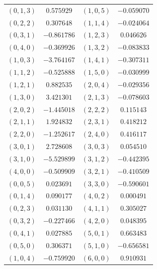 \begin{table}
\begin{tabular}{cc@{\qquad}cc}
$(0,1,3)$ & $0.575929$ & $(1,0,5)$ & $-0.059070$ \\
$(0,2,2)$ & $0.307648$ & $(1,1,4)$ & $-0.024064$ \\
$(0,3,1)$ & $-0.861786$ & $(1,2,3)$ & $0.046626$ \\
$(0,4,0)$ & $-0.369926$ & $(1,3,2)$ & $-0.083833$ \\
$(1,0,3)$ & $-3.764167$ & $(1,4,1)$ & $-0.307311$ \\
$(1,1,2)$ & $-0.525888$ & $(1,5,0)$ & $-0.030999$ \\
$(1,2,1)$ & $0.882535$ & $(2,0,4)$ & $-0.029356$ \\
$(1,3,0)$ & $3.421301$ & $(2,1,3)$ & $-0.078603$ \\
$(2,0,2)$ & $-1.445018$ & $(2,2,2)$ & $0.115143$ \\
$(2,1,1)$ & $1.924832$ & $(2,3,1)$ & $0.418212$ \\
$(2,2,0)$ & $-1.252617$ & $(2,4,0)$ & $0.416117$ \\
$(3,0,1)$ & $2.728608$ & $(3,0,3)$ & $0.054510$ \\
$(3,1,0)$ & $-5.529899$ & $(3,1,2)$ & $-0.442395$ \\
$(4,0,0)$ & $-0.509909$ & $(3,2,1)$ & $-0.410509$ \\
$(0,0,5)$ & $0.023691$ & $(3,3,0)$ & $-0.590601$ \\
$(0,1,4)$ & $0.090177$ & $(4,0,2)$ & $0.000491$ \\
$(0,2,3)$ & $0.031130$ & $(4,1,1)$ & $0.305027$ \\
$(0,3,2)$ & $-0.227466$ & $(4,2,0)$ & $0.048395$ \\
$(0,4,1)$ & $0.027885$ & $(5,0,1)$ & $0.663483$ \\
$(0,5,0)$ & $0.306371$ & $(5,1,0)$ & $-0.656581$ \\
$(1,0,4)$ & $-0.759920$ & $(6,0,0)$ & $0.910931$ \\
\hline
\end{tabular}
\end{table}
